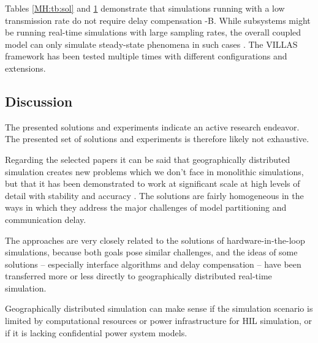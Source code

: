 \documentclass[a4paper]{atseminar}
\begin{document}
\begin{table}[h]
{\begin{tabular}{ll|lllllll}

\end{tabular}
\label{MH:tb:exp}
}%
\end{table}

Tables \ref{MH:tb:sol} and \ref{MH:tb:exp} demonstrate that simulations running with a low transmission rate do not require delay compensation \cite{palmintier2015, lundstrom2017} \cite{pellegrino2020}-B. While subsystems might be running real-time simulations with large sampling rates, the overall coupled model can only simulate steady-state phenomena in such cases \cite{palmintier2015}. The VILLAS framework has been tested multiple times with different configurations and extensions.


\subsection{Discussion}
\label{MH:sec:discuss}


The presented solutions and experiments indicate an active research endeavor. The presented set of solutions and experiments is therefore likely not exhaustive.

Regarding the selected papers it can be said that geographically distributed simulation creates new problems which we don't face in monolithic simulations, but that it has been demonstrated to work at significant scale at high levels of detail with stability and accuracy \cite{monti2018}. The solutions are fairly homogeneous in the ways in which they address the major challenges of model partitioning and communication delay.

The approaches are very closely related to the solutions of hardware-in-the-loop simulations, because both goals pose similar challenges, and the ideas of some solutions -- especially interface algorithms and delay compensation -- have been transferred more or less directly to geographically distributed real-time simulation.

Geographically distributed simulation can make sense if the simulation scenario is limited by computational resources or power infrastructure for HIL simulation, or if it is lacking confidential power system models.
\end{document}
